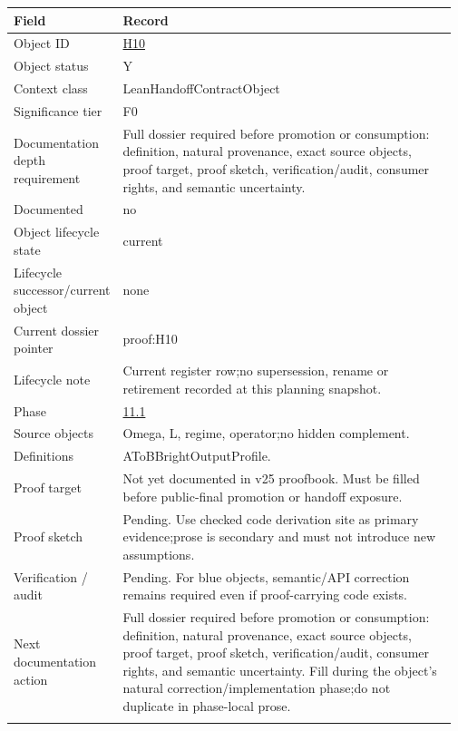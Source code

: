 \begin{longtable}{L{0.16\linewidth} L{0.81\linewidth}}
\hline
\textbf{Field} & \textbf{Record}\\
\hline
Object ID & \hyperlink{object-row-H10}{H10}\\
\hline\addlinespace[0.20em]
Object status & Y\\
\hline\addlinespace[0.20em]
Context class & LeanHandoffContractObject\\
\hline\addlinespace[0.20em]
Significance tier & F0\\
\hline\addlinespace[0.20em]
Documentation depth requirement & Full dossier required before promotion or consumption: definition, natural provenance, exact source objects, proof target, proof sketch, verification/\allowbreak{}audit, consumer rights, and semantic uncertainty.\\
\hline\addlinespace[0.20em]
Documented & no\\
\hline\addlinespace[0.20em]
Object lifecycle state & current\\
\hline\addlinespace[0.20em]
Lifecycle successor/\allowbreak{}current object & none\\
\hline\addlinespace[0.20em]
Current dossier pointer & proof:H10\\
\hline\addlinespace[0.20em]
Lifecycle note & Current register row;\newline no supersession, rename or retirement recorded at this planning snapshot.\\
\hline\addlinespace[0.20em]
Phase & \hyperlink{phase-row-11-1}{11.1}\\
\hline\addlinespace[0.20em]
Source objects & Omega, L, regime, operator;\newline no hidden complement.\\
\hline\addlinespace[0.20em]
Definitions & AToBBrightOutputProfile.\\
\hline\addlinespace[0.20em]
Proof target & Not yet documented in v25 proofbook. Must be filled before public-final promotion or handoff exposure.\\
\hline\addlinespace[0.20em]
Proof sketch & Pending. Use checked code derivation site as primary evidence;\newline prose is secondary and must not introduce new assumptions.\\
\hline\addlinespace[0.20em]
Verification /\allowbreak{} audit & Pending. For blue objects, semantic/\allowbreak{}API correction remains required even if proof-carrying code exists.\\
\hline\addlinespace[0.20em]
Next documentation action & Full dossier required before promotion or consumption: definition, natural provenance, exact source objects, proof target, proof sketch, verification/\allowbreak{}audit, consumer rights, and semantic uncertainty. Fill during the object's natural correction/\allowbreak{}implementation phase;\newline do not duplicate in phase-local prose.\\
\hline\addlinespace[0.20em]
\end{longtable}
